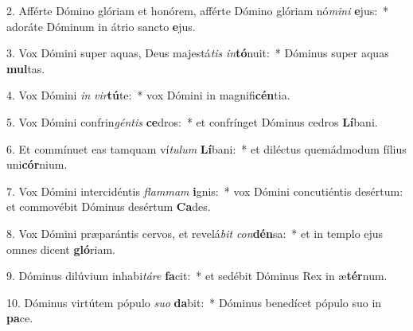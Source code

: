 2. Afférte Dómino glóriam et honórem, afférte Dómino glóriam nó\textit{mi}\textit{ni} \textbf{e}jus:~*  adoráte Dóminum in átrio sancto \textbf{e}jus.\

3. Vox Dómini super aquas, Deus majestá\textit{tis} \textit{in}\textbf{tó}nuit:~*  Dóminus super aquas \textbf{mul}tas.\

4. Vox Dómini \textit{in} \textit{vir}\textbf{tú}te:~*  vox Dómini in magnifi\textbf{cén}tia.\

5. Vox Dómini confrin\textit{gén}\textit{tis} \textbf{ce}dros:~*  et confrínget Dóminus cedros \textbf{Lí}bani.\

6. Et commínuet eas tamquam ví\textit{tu}\textit{lum} \textbf{Lí}bani:~*  et diléctus quemádmodum fílius uni\textbf{cór}nium.\

7. Vox Dómini intercidéntis \textit{flam}\textit{mam} \textbf{i}gnis:~*  vox Dómini concutiéntis desértum: et commovébit Dóminus desértum \textbf{Ca}des.\

8. Vox Dómini præparántis cervos, et revelá\textit{bit} \textit{con}\textbf{dén}sa:~*  et in templo ejus omnes dicent \textbf{gló}riam.\

9. Dóminus dilúvium inhabi\textit{tá}\textit{re} \textbf{fa}cit:~*  et sedébit Dóminus Rex in æ\textbf{tér}num.\

10. Dóminus virtútem pópulo \textit{su}\textit{o} \textbf{da}bit:~*  Dóminus benedícet pópulo suo in \textbf{pa}ce.\

